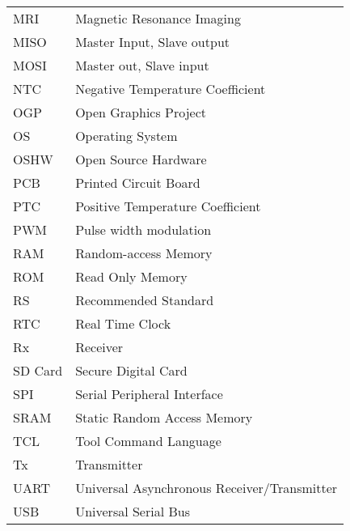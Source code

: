 \begin{tabular}{ll} \\
MRI & Magnetic Resonance Imaging \\
MISO & Master Input, Slave output \\
MOSI & Master out, Slave input \\
NTC & Negative Temperature Coefficient \\
OGP & Open Graphics Project \\
OS & Operating System \\
OSHW & Open Source Hardware \\
PCB & Printed Circuit Board \\
PTC & Positive Temperature Coefficient \\
PWM & Pulse width modulation \\
RAM & Random-access Memory \\
ROM & Read Only Memory \\
RS & Recommended Standard \\
RTC & Real Time Clock \\
Rx & Receiver \\
SD Card & Secure Digital Card \\
SPI & Serial Peripheral Interface \\
SRAM & Static Random Access Memory \\
TCL & Tool Command Language \\
Tx & Transmitter \\
UART & Universal Asynchronous Receiver/Transmitter \\
USB & Universal Serial Bus \\
\end{tabular}
